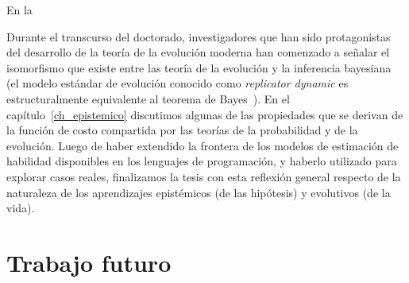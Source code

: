 \documentclass[a4paper,11pt]{book}
\theoremstyle{definition}
\begin{document}

En la

Durante el transcurso del doctorado, investigadores que han sido protagonistas del desarrollo de la teor\'ia de la evoluci\'on moderna han comenzado a se\~nalar el isomorfismo que existe entre las teor\'ia de la evoluci\'on y la inferencia bayesiana~\cite{czegel2019-bayesianEvolution, czegel2022-bayesDarwin} (el modelo est\'andar de evoluci\'on conocido como \emph{replicator dynamic} \cite{taylor1978-replicatorDynamic} es estructuralmente equivalente al teorema de Bayes~\cite{harper2009-replicatorAsInference,shalizi2009-replicatorAsInference}).
%
En el cap\'itulo~\ref{ch_epistemico} discutimos algunas de las propiedades que se derivan de la funci\'on de costo compartida por las teor\'ias de la probabilidad y de la evoluci\'on.
%
Luego de haber extendido la frontera de los modelos de estimaci\'on de habilidad disponibles en los lenguajes de programaci\'on, y haberlo utilizado para explorar casos reales, finalizamos la tesis con esta reflexi\'on general respecto de la naturaleza de los aprendizajes epist\'emicos (de las hip\'otesis) y evolutivos (de la vida).


























































\chapter{Trabajo futuro} \label{ch_volverAlFuturo}
\end{document}
